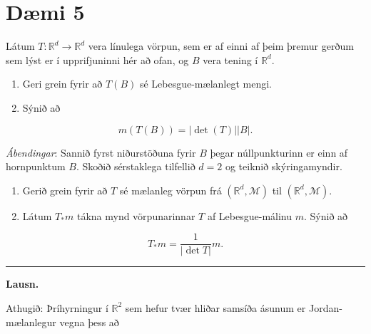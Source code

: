 \documentclass[]{book}
\newenvironment{Shaded}{\begin{snugshade}}{\end{snugshade}}
\newcommand{\DataTypeTok}[1]{\textcolor[rgb]{0.13,0.29,0.53}{#1}}
\newcommand{\DecValTok}[1]{\textcolor[rgb]{0.00,0.00,0.81}{#1}}
\newcommand{\FloatTok}[1]{\textcolor[rgb]{0.00,0.00,0.81}{#1}}
\newcommand{\KeywordTok}[1]{\textcolor[rgb]{0.13,0.29,0.53}{\textbf{#1}}}
\newcommand{\NormalTok}[1]{#1}
\newcommand{\OperatorTok}[1]{\textcolor[rgb]{0.81,0.36,0.00}{\textbf{#1}}}
\newcommand{\StringTok}[1]{\textcolor[rgb]{0.31,0.60,0.02}{#1}}
\begin{document}
\hypertarget{dmi-5-5}{%
\section*{Dæmi 5}\label{dmi-5-5}}

Látum \(T:\mathbb R^d\rightarrow\mathbb R^d\) vera línulega vörpun, sem er af einni af þeim þremur gerðum sem lýst er í upprifjuninni hér að ofan, og \(B\) vera tening í \(\mathbb R^d\).

\begin{enumerate}
\def\labelenumi{\arabic{enumi}.}
\item
  Geri grein fyrir að \(T(B)\) sé Lebesgue-mælanlegt mengi.
\item
  Sýnið að
\end{enumerate}

\[
m(T(B)) = |\det(T)||B|.
\]

\emph{Ábendingar}: Sannið fyrst niðurstöðuna fyrir \(B\) þegar núllpunkturinn er einn af hornpunktum \(B\). Skoðið sérstaklega tilfellið \(d=2\) og teiknið skýringamyndir.

\begin{enumerate}
\def\labelenumi{\arabic{enumi}.}
\setcounter{enumi}{2}
\item
  Gerið grein fyrir að \(T\) sé mælanleg vörpun frá \((\mathbb R^d,\mathcal M)\) til \((\mathbb R^d,\mathcal M)\).
\item
  Látum \(T_*m\) tákna mynd vörpunarinnar \(T\) af Lebesgue-málinu \(m\). Sýnið að
\end{enumerate}

\[
T_*m = \frac{1}{|\det T|}m.
\]

\begin{center}\rule{0.5\linewidth}{\linethickness}\end{center}

\textbf{Lausn.}

Athugið: Þríhyrningur í \(\mathbb R^2\) sem hefur tvær hliðar samsíða ásunum er Jordan-mælanlegur vegna þess að

\begin{Shaded}
\end{Shaded}
\end{document}
